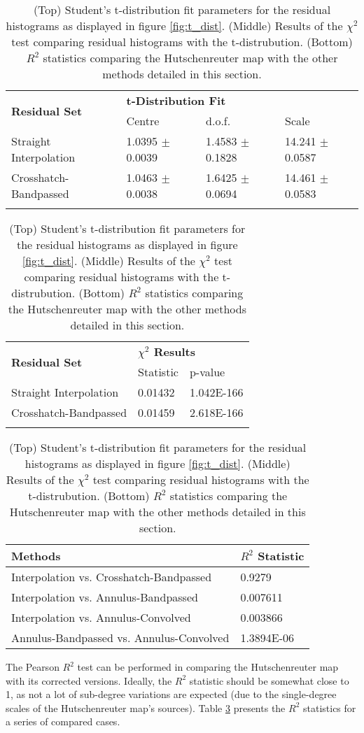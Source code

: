 \begin{table}
    \centering
    \begin{tabular}{l l l l}
        \hline
        \multirow{2}{*}{\bfseries{Residual Set}} & \multicolumn{3}{l}{\bfseries{t-Distribution Fit}} \\
        & Centre & d.o.f. & Scale \\
        \hline
        Straight Interpolation & 1.0395 $\pm$ 0.0039 & 1.4583 $\pm$ 0.1828 & 14.241 $\pm$ 0.0587 \\
        Crosshatch-Bandpassed & 1.0463 $\pm$ 0.0038 & 1.6425 $\pm$ 0.0694 & 14.461 $\pm$ 0.0583 \\
        \hline
        & & & \\
    \end{tabular}
    \begin{tabular}{l l l}
        \hline
        \multirow{2}{*}{\bfseries{Residual Set}} & \multicolumn{2}{l}{\bfseries{$\chi^2$ Results}} \\
        & Statistic & p-value \\
        \hline
        Straight Interpolation & 0.01432 & 1.042E-166 \\
        Crosshatch-Bandpassed & 0.01459 & 2.618E-166 \\
        \hline
        & & \\
    \end{tabular}
    \begin{tabular}{l l}
        \hline
        \bfseries{Methods} & \bfseries{$R^2$ Statistic} \\
        \hline
        Interpolation vs. Crosshatch-Bandpassed & 0.9279 \\
        Interpolation vs. Annulus-Bandpassed & 0.007611 \\
        Interpolation vs. Annulus-Convolved & 0.003866 \\
        Annulus-Bandpassed vs. Annulus-Convolved & 1.3894E-06 \\
        \hline
    \end{tabular}
    \caption{(Top) Student's t-distribution fit parameters for the residual histograms as displayed in figure \ref{fig:t_dist}. (Middle) Results of the $\chi^2$ test comparing residual histograms with the t-distrubution. (Bottom) $R^2$ statistics comparing the Hutschenreuter map with the other methods detailed in this section.}
    \label{tab:fr_stats}
\end{table}

The Pearson $R^2$ test can be performed in comparing the Hutschenreuter map with its corrected versions. Ideally, the $R^2$ statistic should be somewhat close to 1, as not a lot of sub-degree variations are expected (due to the single-degree scales of the Hutschenreuter map's sources). Table \ref{tab:fr_stats} presents the $R^2$ statistics for a series of compared cases.


